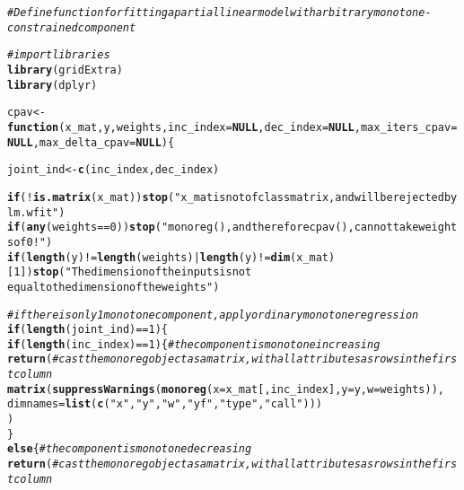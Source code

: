 \documentclass[10pt]{olplainarticle}\usepackage[]{graphicx}\usepackage[]{color}
\makeatletter
\newcommand{\hlnum}[1]{\textcolor[rgb]{0.686,0.059,0.569}{#1}}%
\newcommand{\hlstr}[1]{\textcolor[rgb]{0.192,0.494,0.8}{#1}}%
\newcommand{\hlcom}[1]{\textcolor[rgb]{0.678,0.584,0.686}{\textit{#1}}}%
\newcommand{\hlopt}[1]{\textcolor[rgb]{0,0,0}{#1}}%
\newcommand{\hlstd}[1]{\textcolor[rgb]{0.345,0.345,0.345}{#1}}%
\newcommand{\hlkwa}[1]{\textcolor[rgb]{0.161,0.373,0.58}{\textbf{#1}}}%
\newcommand{\hlkwb}[1]{\textcolor[rgb]{0.69,0.353,0.396}{#1}}%
\newcommand{\hlkwc}[1]{\textcolor[rgb]{0.333,0.667,0.333}{#1}}%
\newcommand{\hlkwd}[1]{\textcolor[rgb]{0.737,0.353,0.396}{\textbf{#1}}}%
\newenvironment{kframe}{%
 \def\at@end@of@kframe{}%
 \ifinner\ifhmode%
  \def\at@end@of@kframe{\end{minipage}}%
  \begin{minipage}{\columnwidth}%
 \fi\fi%
 \def\FrameCommand##1{\hskip\@totalleftmargin \hskip-\fboxsep
 \colorbox{shadecolor}{##1}\hskip-\fboxsep
     \hskip-\linewidth \hskip-\@totalleftmargin \hskip\columnwidth}%
 \MakeFramed {\advance\hsize-\width
   \@totalleftmargin\z@ \linewidth\hsize
   \@setminipage}}%
 {\par\unskip\endMakeFramed%
 \at@end@of@kframe}
\newenvironment{knitrout}{}{} %
\makeatother
\begin{document}
\begin{appendices}


\begin{knitrout}
\color{fgcolor}\begin{kframe}
\begin{alltt}
\hlcom{# Define function for fitting a partial linear model with arbitrary monotone-constrained component}

\hlcom{# import libraries}
\hlkwd{library}\hlstd{(gridExtra)}
\hlkwd{library}\hlstd{(dplyr)}


\hlstd{cpav} \hlkwb{<-} \hlkwa{function}\hlstd{(}\hlkwc{x_mat}\hlstd{,} \hlkwc{y}\hlstd{,} \hlkwc{weights}\hlstd{,} \hlkwc{inc_index}\hlstd{=}\hlkwa{NULL}\hlstd{,} \hlkwc{dec_index}\hlstd{=}\hlkwa{NULL}\hlstd{,} \hlkwc{max_iters_cpav}\hlstd{=}\hlkwa{NULL}\hlstd{,} \hlkwc{max_delta_cpav}\hlstd{=}\hlkwa{NULL}\hlstd{)\{}

  \hlstd{joint_ind} \hlkwb{<-} \hlkwd{c}\hlstd{(inc_index, dec_index)}

  \hlkwa{if}\hlstd{(}\hlopt{!}\hlkwd{is.matrix}\hlstd{(x_mat))} \hlkwd{stop}\hlstd{(}\hlstr{"x_mat is not of class matrix, and will be rejected by lm.wfit"}\hlstd{)}
  \hlkwa{if}\hlstd{(}\hlkwd{any}\hlstd{(weights} \hlopt{==} \hlnum{0}\hlstd{))} \hlkwd{stop}\hlstd{(}\hlstr{"monoreg(), and therefore cpav(), cannot take weights of 0!"}\hlstd{)}
  \hlkwa{if}\hlstd{(}\hlkwd{length}\hlstd{(y)} \hlopt{!=} \hlkwd{length}\hlstd{(weights)} \hlopt{|} \hlkwd{length}\hlstd{(y)} \hlopt{!=} \hlkwd{dim}\hlstd{(x_mat)[}\hlnum{1}\hlstd{])} \hlkwd{stop}\hlstd{(}\hlstr{"The dimension of the inputs is not 
                                        equal to the dimension of the weights"}\hlstd{)}

  \hlcom{# if there is only 1 monotone component, apply ordinary monotone regression}
  \hlkwa{if}\hlstd{(}\hlkwd{length}\hlstd{(joint_ind)} \hlopt{==} \hlnum{1}\hlstd{)\{}
    \hlkwa{if}\hlstd{(}\hlkwd{length}\hlstd{(inc_index)} \hlopt{==} \hlnum{1}\hlstd{)\{} \hlcom{# the component is monotone increasing}
      \hlkwd{return}\hlstd{(} \hlcom{# cast the monoreg object as a matrix, with all attributes as rows in the first column}
        \hlkwd{matrix}\hlstd{(}\hlkwd{suppressWarnings}\hlstd{(}\hlkwd{monoreg}\hlstd{(}\hlkwc{x} \hlstd{= x_mat[,inc_index],} \hlkwc{y} \hlstd{= y,} \hlkwc{w} \hlstd{= weights)),}
               \hlkwc{dimnames} \hlstd{=} \hlkwd{list}\hlstd{(}\hlkwd{c}\hlstd{(}\hlstr{"x"}\hlstd{,} \hlstr{"y"}\hlstd{,} \hlstr{"w"}\hlstd{,} \hlstr{"yf"}\hlstd{,} \hlstr{"type"}\hlstd{,} \hlstr{"call"}\hlstd{)))}
      \hlstd{)}
    \hlstd{\}}
    \hlkwa{else}\hlstd{\{} \hlcom{# the component is monotone decreasing}
      \hlkwd{return}\hlstd{(} \hlcom{# cast the monoreg object as a matrix, with all attributes as rows in the first column}


\end{alltt}
\end{kframe}
\end{knitrout}
\end{appendices}
\end{document}
